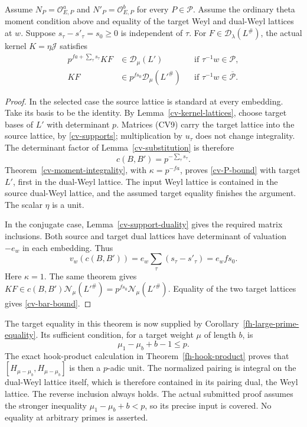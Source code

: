 \begin{theorem}\label{cv-two-kernels}
Assume $N_P=\mathcal O_{E,P}^a$ and
$N'_P=\mathcal O_{E,P}^b$ for every $P\in\mathcal P$.
Assume the ordinary theta moment condition above and equality of the target
Weyl and dual-Weyl lattices at $w$.  Suppose
$s_\tau-s'_\tau=s_0\ge0$ is independent of $\tau$.
For $F\in\mathcal D_\lambda(L^\#)$, the actual kernel $K=\eta\mathcal J$
satisfies
\begin{align}
 p^{fa+\sum_\tau s_\tau}KF
       &\in\mathcal D_\mu(L')
       &&\text{if }\tau^{-1}w\in\mathcal P,\label{cv-P-bound}\\
 KF&\in p^{fs_0}\mathcal D_\mu(L'^\#)
       &&\text{if }\tau^{-1}w\in\overline{\mathcal P}.
                                                      \label{cv-bar-bound}
\end{align}
\end{theorem}
\begin{proof}
In the selected case the source lattice is standard at every
embedding.  Take its basis to be the identity.  By
Lemma~\ref{cv-kernel-lattices}, choose target bases of $L'$ with
determinant $p$.  Matrices (CV9) carry the target lattice into the
source lattice, by \eqref{cv-supports}; multiplication by $u_\tau$
does not change integrality.  The determinant factor of
Lemma~\ref{cv-substitution} is therefore
\[
                         c(B,B')=p^{-\sum_\tau s_\tau}.
\]
Theorem~\ref{cv-moment-integrality}, with $\kappa=p^{-fa}$,
proves \eqref{cv-P-bound} with target $L'$, first in the dual-Weyl
lattice.  The input Weyl lattice is contained in the source
dual-Weyl lattice, and the assumed target equality finishes the
argument.  The scalar $\eta$ is a unit.

In the conjugate case, Lemma~\ref{cv-support-duality} gives the
required matrix inclusions.  Both source and target dual lattices
have determinant of valuation $-e_w$ in each embedding.  Thus
\[
 v_w(c(B,B'))=e_w\sum_\tau(s_\tau-s'_\tau)=e_wfs_0.
\]
Here $\kappa=1$.  The same theorem gives
$KF\in c(B,B')\mathcal N_\mu(L'^\#)
=p^{fs_0}\mathcal N_\mu(L'^\#)$.  Equality of the two target
lattices gives \eqref{cv-bar-bound}.
\end{proof}

The target equality in this theorem is now supplied by
Corollary~\ref{fh-large-prime-equality}.  Its sufficient condition,
for a target weight $\mu$ of length $b$, is
\[
                       \mu_1-\mu_b+b-1\le p.
 \tag{CV11}
\]
The exact hook-product calculation in
Theorem~\ref{fh-hook-product} proves that
$[H_{\mu-\mu_b},H_{\mu-\mu_b}]$ is then a $p$-adic unit.  The
normalized pairing is integral on the dual-Weyl lattice itself,
which is therefore contained in its pairing dual, the Weyl lattice.
The reverse inclusion always holds.  The actual submitted proof
assumes the stronger inequality $\mu_1-\mu_b+b<p$, so its precise
input is covered.  No equality at arbitrary primes is asserted.

